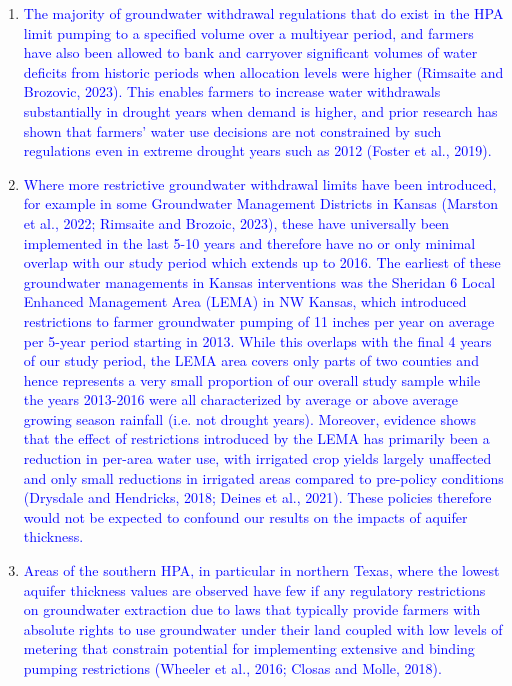 \documentclass[
]{article}
\begin{document}
\begin{itemize}
\begin{itemize}
  \begin{enumerate}
      \item \textcolor{blue}{The majority of groundwater withdrawal regulations that do exist in the HPA limit pumping to a specified volume over a multiyear period, and farmers have also been allowed to bank and carryover significant volumes of water deficits from historic periods when allocation levels were higher (Rimsaite and Brozovic, 2023). This enables farmers to increase water withdrawals substantially in drought years when demand is higher, and prior research has shown that farmers' water use decisions are not constrained by such regulations even in extreme drought years such as 2012 (Foster et al., 2019).}
      \item \textcolor{blue}{Where more restrictive groundwater withdrawal limits have been introduced, for example in some Groundwater Management Districts in Kansas (Marston et al., 2022; Rimsaite and Brozoic, 2023), these have universally been implemented in the last 5-10 years and therefore have no or only minimal overlap with our study period which extends up to 2016. The earliest of these groundwater managements in Kansas interventions was the Sheridan 6 Local Enhanced Management Area (LEMA) in NW Kansas, which introduced restrictions to farmer groundwater pumping of 11 inches per year on average per 5-year period starting in 2013. While this overlaps with the final 4 years of our study period, the LEMA area covers only parts of two counties and hence represents a very small proportion of our overall study sample while the years 2013-2016 were all characterized by average or above average growing season rainfall (i.e. not drought years). Moreover, evidence shows that the effect of restrictions introduced by the LEMA has primarily been a reduction in per-area water use, with irrigated crop yields largely unaffected and only small reductions in irrigated areas compared to pre-policy conditions (Drysdale and Hendricks, 2018; Deines et al., 2021). These policies therefore would not be expected to confound our results on the impacts of aquifer thickness.}
      \item \textcolor{blue}{Areas of the southern HPA, in particular in northern Texas, where the lowest aquifer thickness values are observed have few if any regulatory restrictions on groundwater extraction due to laws that typically provide farmers with absolute rights to use groundwater under their land coupled with low levels of metering that constrain potential for implementing extensive and binding pumping restrictions (Wheeler et al., 2016; Closas and Molle, 2018).}
  \end{enumerate}


\end{itemize}
\end{itemize}
\end{document}
